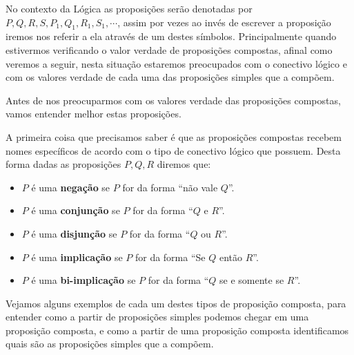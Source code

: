  No contexto da Lógica as proposições serão denotadas por $P, Q, R, S, P_1, Q_1, R_1, S_1, \cdots$, assim por vezes ao invés de escrever a proposição iremos nos referir a ela através de um destes símbolos. Principalmente quando estivermos verificando o valor verdade de proposições compostas, afinal como veremos a seguir, nesta situação estaremos preocupados com o conectivo lógico e com os valores verdade de cada uma das proposições simples que a compõem.

 Antes de nos preocuparmos com os valores verdade das proposições compostas, vamos entender melhor estas proposições.

 A primeira coisa que precisamos saber é que as proposições compostas recebem nomes específicos de acordo com o tipo de conectivo lógico que possuem. Desta forma dadas as proposições $P, Q, R$ diremos que:

 \begin{itemize}
  \item $P$ é uma \textbf{negação} se $P$ for da forma ``não vale $Q$''.
  \item $P$ é uma \textbf{conjunção} se $P$ for da forma ``$Q$ e $R$''.
  \item $P$ é uma \textbf{disjunção} se $P$ for da forma ``$Q$ ou $R$''.
  \item $P$ é uma \textbf{implicação} se $P$ for da forma ``Se $Q$ então $R$''.
  \item $P$ é uma \textbf{bi-implicação} se $P$ for da forma ``$Q$ se e somente se $R$''.
 \end{itemize}

 Vejamos alguns exemplos de cada um destes tipos de proposição composta, para entender como a partir de proposições simples podemos chegar em uma proposição composta, e como a partir de uma proposição composta identificamos quais são as proposições simples que a compõem.

